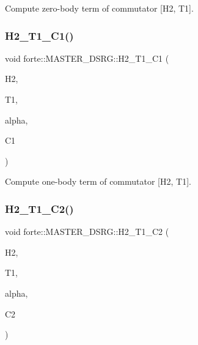 Compute zero-\/body term of commutator \mbox{[}H2, T1\mbox{]}. 

\mbox{\label{classforte_1_1_m_a_s_t_e_r___d_s_r_g_a10484c21cfa5e26d83fc0928fb050389}} 
\subsubsection{\texorpdfstring{H2\+\_\+\+T1\+\_\+\+C1()}{H2\_T1\_C1()}}
{\footnotesize\ttfamily void forte\+::\+M\+A\+S\+T\+E\+R\+\_\+\+D\+S\+R\+G\+::\+H2\+\_\+\+T1\+\_\+\+C1 (\begin{DoxyParamCaption}\item[{Blocked\+Tensor \&}]{H2,  }\item[{Blocked\+Tensor \&}]{T1,  }\item[{const double \&}]{alpha,  }\item[{Blocked\+Tensor \&}]{C1 }\end{DoxyParamCaption})\hspace{0.3cm}{\ttfamily [protected]}}



Compute one-\/body term of commutator \mbox{[}H2, T1\mbox{]}. 

\mbox{\label{classforte_1_1_m_a_s_t_e_r___d_s_r_g_a662113c1c718db206ab118b2dbd85b65}} 
\subsubsection{\texorpdfstring{H2\+\_\+\+T1\+\_\+\+C2()}{H2\_T1\_C2()}}
{\footnotesize\ttfamily void forte\+::\+M\+A\+S\+T\+E\+R\+\_\+\+D\+S\+R\+G\+::\+H2\+\_\+\+T1\+\_\+\+C2 (\begin{DoxyParamCaption}\item[{Blocked\+Tensor \&}]{H2,  }\item[{Blocked\+Tensor \&}]{T1,  }\item[{const double \&}]{alpha,  }\item[{Blocked\+Tensor \&}]{C2 }\end{DoxyParamCaption})\hspace{0.3cm}{\ttfamily [protected]}}



